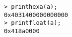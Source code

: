 \begin{center}\begin{minipage}{15cm}\begin{Verbatim}[frame=single]
> printhexa(a);
0x4031400000000000
> printfloat(a);
0x418a0000
\end{Verbatim}
\end{minipage}\end{center}
